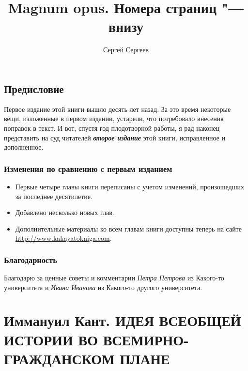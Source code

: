 \documentclass[a4paper]{book}
\begin{document}
\author{Сергей Сергеев}
\title{Magnum opus. Номера страниц "--- внизу}
\maketitle
\section*{Предисловие}

Первое издание этой книги вышло десять лет назад. За это время некоторые вещи, изложенные в первом издании, устарели, что потребовало внесения поправок в текст. И вот, спустя год плодотворной работы, я рад наконец представить на суд читателей \textbf{\textit{второе издание}} этой книги, исправленное и дополненное.

\subsection*{Изменения по сравнению с первым изданием}

\begin{itemize}[label=\hspace*{.3cm}\textcolor{blue}{$\sqbullet$},align=left,labelwidth=.5em,itemindent=+,leftmargin=0.3cm]
\item Первые четыре главы книги переписаны с учетом изменений, произошедших за последнее десятилетие.
\item Добавлено несколько новых глав.
\item Дополнительные материалы ко всем главам книги доступны теперь на сайте \url{http://www.kakayatokniga.com}.
\end{itemize}

\subsection*{Благодарность}

Благодарю за ценные советы и комментарии \emph{Петра Петрова} из Какого-то университета и \emph{Ивана Иванова} из Какого-то другого университета.
\medskip


\mainmatter
\chapter{Иммануил Кант.  ИДЕЯ ВСЕОБЩЕЙ ИСТОРИИ ВО ВСЕМИРНО-ГРАЖДАНСКОМ ПЛАНЕ}
\end{document}
